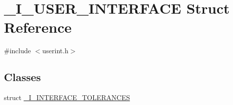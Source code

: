 \hypertarget{struct___i___u_s_e_r___i_n_t_e_r_f_a_c_e}{}\section{\+\_\+\+I\+\_\+\+U\+S\+E\+R\+\_\+\+I\+N\+T\+E\+R\+F\+A\+CE Struct Reference}
\label{struct___i___u_s_e_r___i_n_t_e_r_f_a_c_e}


{\ttfamily \#include $<$userint.\+h$>$}

\subsection*{Classes}
\begin{DoxyCompactItemize}
\item 
struct \hyperlink{struct___i___u_s_e_r___i_n_t_e_r_f_a_c_e_db/d81/struct___i___u_s_e_r___i_n_t_e_r_f_a_c_e_1_1___i___i_n_t_e_r_f_a_c_e___t_o_l_e_r_a_n_c_e_s}{\+\_\+\+I\+\_\+\+I\+N\+T\+E\+R\+F\+A\+C\+E\+\_\+\+T\+O\+L\+E\+R\+A\+N\+C\+ES}
\end{DoxyCompactItemize}

